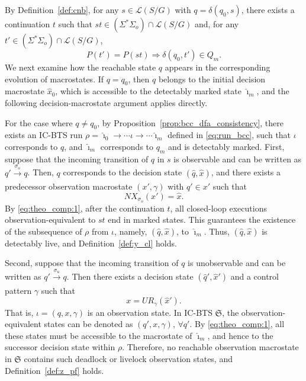 \documentclass[twocolumn]{autart}
\begin{document}
\begin{pf}
By Definition~\ref{def:cnb}, for any $s \in \mathcal{L}(S / G)$ with $q = \delta(q_0, s)$, there exists a continuation $t$ such that $st \in (\Sigma^*\Sigma_o) \cap \mathcal{L}(S / G)$ and, for any $t' \in (\Sigma^*\Sigma_o) \cap \mathcal{L}(S / G)$,
\begin{equation}\label{eq:theo_comp:1}
    P(t') = P(st) \Rightarrow \delta(q_0, t') \in Q_m.
\end{equation}
%
We next examine how the reachable state $q$ appears in the corresponding evolution of macrostates.
If $q = q_0$, then $q$ belongs to the initial decision macrostate $\hat{x}_{0}$, which is accessible to the detectably marked state $\hat{\imath}_m$, and the following decision-macrostate argument applies directly.



For the case where $q \neq q_0$, by Proposition~\ref{prop:bcc_dfa_consistency}, there exists an IC-BTS run
$\rho = \hat{\imath}_0 \xrightarrow{} \cdots \iota \xrightarrow{} \cdots \hat{\imath}_m$ defined in \eqref{eq:run_bcc}, such that $\iota$ corresponds to $q$, and $\hat{\imath}_m$ corresponds to $q_m$ and is detectably marked.
%
First, suppose that the incoming transition of $q$ in $s$ is observable and can be written as $q' \xrightarrow[]{\sigma_o} q$.
%
Then, $q$ corresponds to the decision state $(\hat{q}, \hat{x})$, and there exists a predecessor observation macrostate $(x', \gamma)$ with $q' \in x'$ such that
$$
NX_{\sigma_o}(x') = \hat{x}.
$$
%
By \eqref{eq:theo_comp:1}, after the continuation $t$, all closed-loop executions observation-equivalent to $st$ end in marked states.
This guarantees the existence of the subsequence of $\rho$ from $\iota$, namely, $(\hat{q}, \hat{x})$, to $\hat{\imath}_m$.
Thus, $(\hat{q}, \hat{x})$ is detectably live, and Definition~\ref{def:y_cl} holds.

Second, suppose that the incoming transition of $q$ is unobservable and can be written as $q' \xrightarrow[]{\sigma_{u}} q$. Then there exists a decision state $(\hat{q}', \hat{x}')$ and a control pattern $\gamma$ such that
$$
x = UR_{\gamma}(\hat{x}').
$$
That is, $\iota = (q, x, \gamma)$ is an observation state.
%
In IC-BTS $\mathfrak{S}$, the observation-equivalent states can be denoted as $(q', x, \gamma)$, $\forall q'$.
By \eqref{eq:theo_comp:1}, all these states must be accessible to the macrostate of $\hat{\imath}_m$, and hence to the successor decision state within $\rho$.
%
Therefore, no reachable observation macrostate in $\mathfrak{S}$ contains such deadlock or livelock observation states, and Definition~\ref{def:z_pf} holds.


\end{pf}
\end{document}
